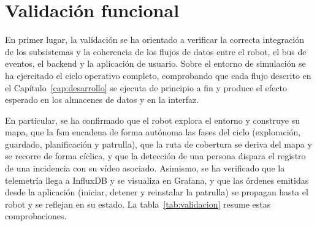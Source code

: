 \section{Validación funcional}
\label{sec:validacion-funcional}

En primer lugar, la validación se ha orientado a verificar la correcta integración de los
subsistemas y la coherencia de los flujos de datos entre el robot, el bus de eventos, el
backend y la aplicación de usuario. Sobre el entorno de simulación se ha ejercitado el
ciclo operativo completo, comprobando que cada flujo descrito en el
Capítulo~\ref{cap:desarrollo} se ejecuta de principio a fin y produce el efecto esperado en
los almacenes de datos y en la interfaz.

En particular, se ha confirmado que el robot explora el entorno y construye su mapa, que la
\gls{fsm} encadena de forma autónoma las fases del ciclo (exploración, guardado,
planificación y patrulla), que la ruta de cobertura se deriva del mapa y se recorre de forma
cíclica, y que la detección de una persona dispara el registro de una incidencia con su
vídeo asociado. Asimismo, se ha verificado que la telemetría llega a InfluxDB y se visualiza
en Grafana, y que las órdenes emitidas desde la aplicación (iniciar, detener y reinstalar la
patrulla) se propagan hasta el robot y se reflejan en su estado. La
tabla~\ref{tab:validacion} resume estas comprobaciones.

